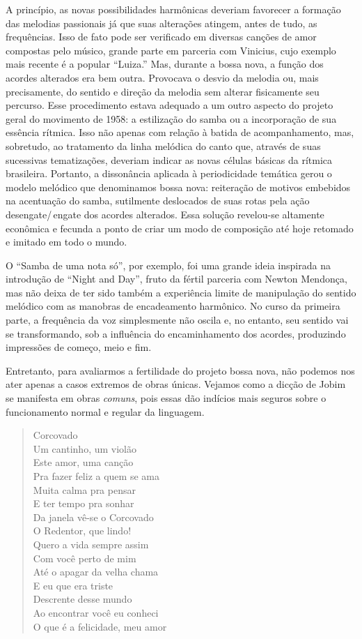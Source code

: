 A princípio, as novas possibilidades harmônicas deveriam favorecer a
formação das melodias passionais já que suas alterações atingem, antes
de tudo, as frequências. Isso de fato pode ser verificado em diversas
canções de amor compostas pelo músico, grande parte em parceria com
Vinicius, cujo exemplo mais recente é a popular ``Luiza.'' Mas, durante a bossa nova, a função dos acordes alterados era
bem outra. Provocava o desvio da melodia ou, mais precisamente, do
sentido e direção da melodia sem alterar fisicamente seu percurso.
Esse procedimento estava adequado a um outro aspecto do projeto geral do
movimento de 1958: a estilização do samba ou a incorporação de sua
essência rítmica. Isso não apenas com relação à batida de
acompanhamento, mas, sobretudo, ao tratamento da linha melódica do canto
que, através de suas sucessivas tematizações, deveriam indicar as novas
células básicas da rítmica brasileira. Portanto, a dissonância aplicada
à periodicidade temática gerou o modelo melódico que denominamos bossa
nova: reiteração de motivos embebidos na acentuação do samba, sutilmente
deslocados de suas rotas pela ação desengate/\,engate dos acordes
alterados. Essa solução revelou-se altamente econômica e fecunda a ponto
de criar um modo de composição até hoje retomado e imitado em todo o
mundo.

O ``Samba de uma nota só'', por exemplo, foi uma grande ideia inspirada na
introdução de ``Night and Day'', fruto da fértil parceria com Newton
Mendonça, mas não deixa de ter sido também a experiência limite de
manipulação do sentido melódico com as manobras de encadeamento
harmônico. No curso da primeira parte, a frequência da voz simplesmente
não oscila e, no entanto, seu sentido vai se transformando, sob a
influência do encaminhamento dos acordes, produzindo impressões de
começo, meio e fim.

Entretanto, para avaliarmos a fertilidade do projeto bossa nova, não
podemos nos ater apenas a casos extremos de obras únicas. Vejamos como a
dicção de Jobim se manifesta em obras \textit{comuns}, pois essas dão
indícios mais seguros sobre o funcionamento normal e regular da
linguagem.

\pagebreak
\begin{verse}
\small{Corcovado\\
Um cantinho, um violão\\
Este amor, uma canção\\
Pra fazer feliz a quem se ama\\
Muita calma pra pensar\\
E ter tempo pra sonhar\\
Da janela vê-se o Corcovado\\
O Redentor, que lindo!\\
Quero a vida sempre assim\\
Com você perto de mim\\
Até o apagar da velha chama\\
E eu que era triste\\
Descrente desse mundo\\
Ao encontrar você eu conheci\\
O que é a felicidade, meu amor}
\end{verse}

